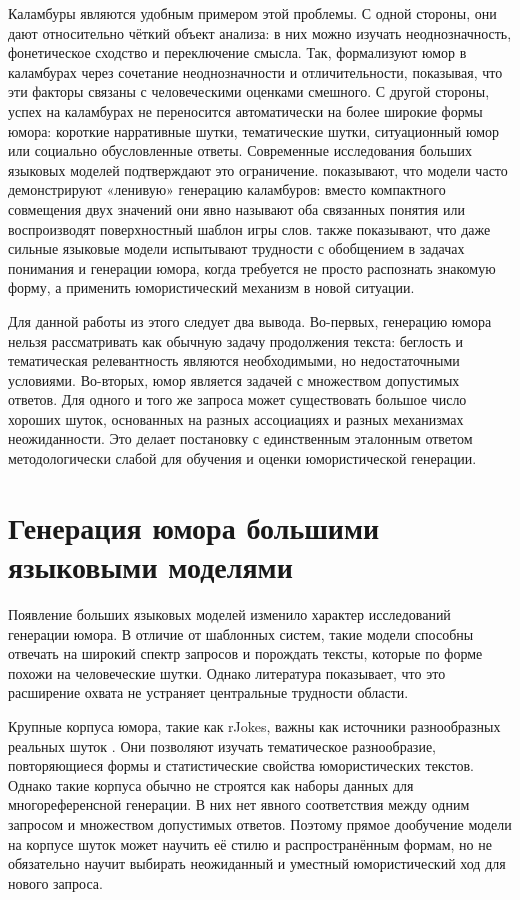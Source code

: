 Каламбуры являются удобным примером этой проблемы. С одной стороны, они дают относительно чёткий объект анализа: в них можно изучать неоднозначность, фонетическое сходство и переключение смысла. Так, \citet{kao2016computational} формализуют юмор в каламбурах через сочетание неоднозначности и отличительности, показывая, что эти факторы связаны с человеческими оценками смешного. С другой стороны, успех на каламбурах не переносится автоматически на более широкие формы юмора: короткие нарративные шутки, тематические шутки, ситуационный юмор или социально обусловленные ответы. Современные исследования больших языковых моделей подтверждают это ограничение. \citet{xu2024good} показывают, что модели часто демонстрируют «ленивую» генерацию каламбуров: вместо компактного совмещения двух значений они явно называют оба связанных понятия или воспроизводят поверхностный шаблон игры слов. \citet{cocchieri2025you} также показывают, что даже сильные языковые модели испытывают трудности с обобщением в задачах понимания и генерации юмора, когда требуется не просто распознать знакомую форму, а применить юмористический механизм в новой ситуации.

Для данной работы из этого следует два вывода. Во-первых, генерацию юмора нельзя рассматривать как обычную задачу продолжения текста: беглость и тематическая релевантность являются необходимыми, но недостаточными условиями. Во-вторых, юмор является задачей с множеством допустимых ответов. Для одного и того же запроса может существовать большое число хороших шуток, основанных на разных ассоциациях и разных механизмах неожиданности. Это делает постановку с единственным эталонным ответом методологически слабой для обучения и оценки юмористической генерации.

\section{Генерация юмора большими языковыми моделями}

Появление больших языковых моделей изменило характер исследований генерации юмора. В отличие от шаблонных систем, такие модели способны отвечать на широкий спектр запросов и порождать тексты, которые по форме похожи на человеческие шутки. Однако литература показывает, что это расширение охвата не устраняет центральные трудности области.

Крупные корпуса юмора, такие как rJokes, важны как источники разнообразных реальных шуток \citep{weller2020rjokes}. Они позволяют изучать тематическое разнообразие, повторяющиеся формы и статистические свойства юмористических текстов. Однако такие корпуса обычно не строятся как наборы данных для многореференсной генерации. В них нет явного соответствия между одним запросом и множеством допустимых ответов. Поэтому прямое дообучение модели на корпусе шуток может научить её стилю и распространённым формам, но не обязательно научит выбирать неожиданный и уместный юмористический ход для нового запроса.

